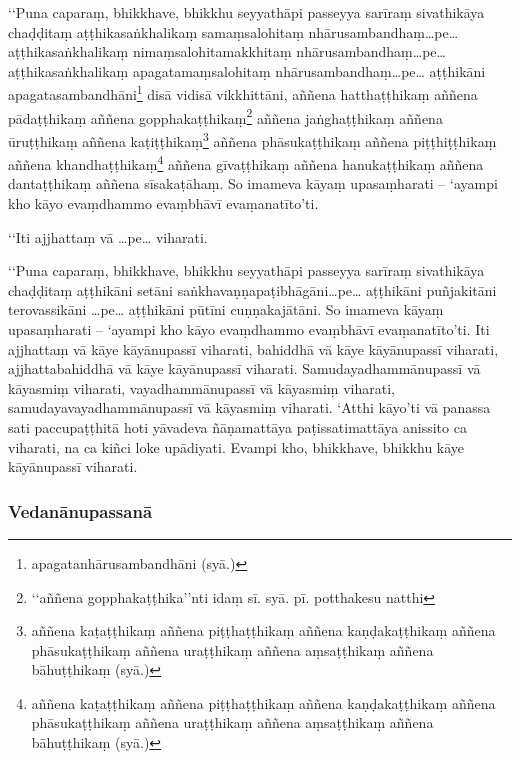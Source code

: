 ‘‘Puna caparaṃ, bhikkhave, bhikkhu seyyathāpi passeyya sarīraṃ sivathikāya chaḍḍitaṃ aṭṭhikasaṅkhalikaṃ samaṃsalohitaṃ nhārusambandhaṃ…pe… aṭṭhikasaṅkhalikaṃ nimaṃsalohitamakkhitaṃ nhārusambandhaṃ…pe… aṭṭhikasaṅkhalikaṃ apagatamaṃsalohitaṃ nhārusambandhaṃ…pe… aṭṭhikāni apagatasambandhāni\footnote{apagatanhārusambandhāni (syā.)} disā vidisā vikkhittāni, aññena hatthaṭṭhikaṃ aññena pādaṭṭhikaṃ aññena gopphakaṭṭhikaṃ\footnote{‘‘aññena gopphakaṭṭhika’’nti idaṃ sī. syā. pī. potthakesu natthi} aññena jaṅghaṭṭhikaṃ aññena ūruṭṭhikaṃ aññena kaṭiṭṭhikaṃ\footnote{aññena kaṭaṭṭhikaṃ aññena piṭṭhaṭṭhikaṃ aññena kaṇḍakaṭṭhikaṃ aññena phāsukaṭṭhikaṃ aññena uraṭṭhikaṃ aññena aṃsaṭṭhikaṃ aññena bāhuṭṭhikaṃ (syā.)} aññena phāsukaṭṭhikaṃ aññena piṭṭhiṭṭhikaṃ aññena khandhaṭṭhikaṃ\footnote{aññena kaṭaṭṭhikaṃ aññena piṭṭhaṭṭhikaṃ aññena kaṇḍakaṭṭhikaṃ aññena phāsukaṭṭhikaṃ aññena uraṭṭhikaṃ aññena aṃsaṭṭhikaṃ aññena bāhuṭṭhikaṃ (syā.)} aññena gīvaṭṭhikaṃ aññena hanukaṭṭhikaṃ aññena dantaṭṭhikaṃ aññena sīsakaṭāhaṃ. So imameva kāyaṃ upasaṃharati – ‘ayampi kho kāyo evaṃdhammo evaṃbhāvī evaṃanatīto’ti.

‘‘Iti ajjhattaṃ vā …pe… viharati.

‘‘Puna caparaṃ, bhikkhave, bhikkhu seyyathāpi passeyya sarīraṃ sivathikāya chaḍḍitaṃ aṭṭhikāni setāni saṅkhavaṇṇapaṭibhāgāni…pe… aṭṭhikāni puñjakitāni terovassikāni …pe… aṭṭhikāni pūtīni cuṇṇakajātāni. So imameva kāyaṃ upasaṃharati – ‘ayampi kho kāyo evaṃdhammo evaṃbhāvī evaṃanatīto’ti. Iti ajjhattaṃ vā kāye kāyānupassī viharati, bahiddhā vā kāye kāyānupassī viharati, ajjhattabahiddhā vā kāye kāyānupassī viharati. Samudayadhammānupassī vā kāyasmiṃ viharati, vayadhammānupassī vā kāyasmiṃ viharati, samudayavayadhammānupassī vā kāyasmiṃ viharati. ‘Atthi kāyo’ti vā panassa sati paccupaṭṭhitā hoti yāvadeva ñāṇamattāya paṭissatimattāya anissito ca viharati, na ca kiñci loke upādiyati. Evampi kho, bhikkhave, bhikkhu kāye kāyānupassī viharati.


\subsubsection{Vedanānupassanā}

